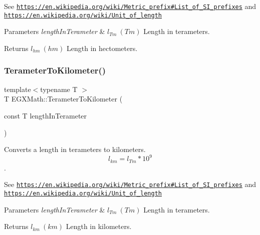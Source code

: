 See \href{https://en.wikipedia.org/wiki/Metric_prefix#List_of_SI_prefixes}{\tt https\+://en.\+wikipedia.\+org/wiki/\+Metric\+\_\+prefix\#\+List\+\_\+of\+\_\+\+S\+I\+\_\+prefixes} and \href{https://en.wikipedia.org/wiki/Unit_of_length}{\tt https\+://en.\+wikipedia.\+org/wiki/\+Unit\+\_\+of\+\_\+length} 
\begin{DoxyParams}{Parameters}
{\em length\+In\+Terameter} & $ l_{Tm}\ (Tm)$ Length in terameters. \\
\hline
\end{DoxyParams}
\begin{DoxyReturn}{Returns}
$ l_{hm}\ (hm)$ Length in hectometers. 
\end{DoxyReturn}
\mbox{\label{group___e_g_x_math-_conversions-_length_conversions-_terameter-_s_i_ga3621654052e072519227ad628e03d68b}} 
\subsubsection{\texorpdfstring{Terameter\+To\+Kilometer()}{TerameterToKilometer()}}
{\footnotesize\ttfamily template$<$typename T $>$ \\
T E\+G\+X\+Math\+::\+Terameter\+To\+Kilometer (\begin{DoxyParamCaption}\item[{const T}]{length\+In\+Terameter }\end{DoxyParamCaption})}



Converts a length in terameters to kilometers. \[ l_{km}=l_{Tm} * 10^{9} \]. 

See \href{https://en.wikipedia.org/wiki/Metric_prefix#List_of_SI_prefixes}{\tt https\+://en.\+wikipedia.\+org/wiki/\+Metric\+\_\+prefix\#\+List\+\_\+of\+\_\+\+S\+I\+\_\+prefixes} and \href{https://en.wikipedia.org/wiki/Unit_of_length}{\tt https\+://en.\+wikipedia.\+org/wiki/\+Unit\+\_\+of\+\_\+length} 
\begin{DoxyParams}{Parameters}
{\em length\+In\+Terameter} & $ l_{Tm}\ (Tm)$ Length in terameters. \\
\hline
\end{DoxyParams}
\begin{DoxyReturn}{Returns}
$ l_{km}\ (km)$ Length in kilometers. 
\end{DoxyReturn}
\mbox{\label{group___e_g_x_math-_conversions-_length_conversions-_terameter-_s_i_gad4a32011802c13e60cc98081113d52c1}} 
